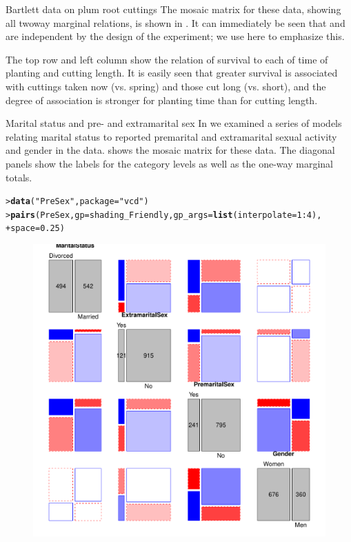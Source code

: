 \documentclass[10pt,krantz2]{krantz}\usepackage[]{graphicx}\usepackage[]{color}
\makeatletter
\newcommand{\hlnum}[1]{\textcolor[rgb]{0.686,0.059,0.569}{#1}}%
\newcommand{\hlstr}[1]{\textcolor[rgb]{0.192,0.494,0.8}{#1}}%
\newcommand{\hlopt}[1]{\textcolor[rgb]{0,0,0}{#1}}%
\newcommand{\hlstd}[1]{\textcolor[rgb]{0.345,0.345,0.345}{#1}}%
\newcommand{\hlkwc}[1]{\textcolor[rgb]{0.333,0.667,0.333}{#1}}%
\newcommand{\hlkwd}[1]{\textcolor[rgb]{0.737,0.353,0.396}{\textbf{#1}}}%
\newenvironment{kframe}{%
 \def\at@end@of@kframe{}%
 \ifinner\ifhmode%
  \def\at@end@of@kframe{\end{minipage}}%
  \begin{minipage}{\columnwidth}%
 \fi\fi%
 \def\FrameCommand##1{\hskip\@totalleftmargin \hskip-\fboxsep
 \colorbox{shadecolor}{##1}\hskip-\fboxsep
     \hskip-\linewidth \hskip-\@totalleftmargin \hskip\columnwidth}%
 \MakeFramed {\advance\hsize-\width
   \@totalleftmargin\z@ \linewidth\hsize
   \@setminipage}}%
 {\par\unskip\endMakeFramed%
 \at@end@of@kframe}
\newenvironment{knitrout}{}{} %
\renewenvironment{knitrout}{\small\renewcommand{\baselinestretch}{.85}}{} %
\makeatother
\begin{document}
\begin{Example}[bartlett]{Bartlett data on plum root cuttings}
\begin{knitrout}
\end{knitrout}
The mosaic matrix for these data, showing all twoway marginal relations, is shown
in .
It can immediately be seen that  and  are independent
by the design of the experiment; we use  here to emphasize
this.

The top row and left column show the relation of survival to each of time of planting
and cutting length.  It is easily seen that greater survival is associated with
cuttings taken now (vs. spring) and those cut long (vs. short),
and the degree of association is stronger for planting time than for cutting length.
\end{Example}

\begin{Example}[marital2]{Marital status and pre- and extramarital sex}
In  we examined a series of models relating marital
status to reported premarital and extramarital sexual activity and gender in the
 data.
 shows the mosaic matrix for these data.
The diagonal panels show the labels for the category levels as well as
the one-way marginal totals.

\begin{knitrout}
\color{fgcolor}\begin{kframe}
\begin{alltt}
\hlstd{> }\hlkwd{data}\hlstd{(}\hlstr{"PreSex"}\hlstd{,} \hlkwc{package} \hlstd{=} \hlstr{"vcd"}\hlstd{)}
\hlstd{> }\hlkwd{pairs}\hlstd{(PreSex,} \hlkwc{gp} \hlstd{= shading_Friendly,} \hlkwc{gp_args} \hlstd{=} \hlkwd{list}\hlstd{(}\hlkwc{interpolate} \hlstd{=} \hlnum{1} \hlopt{:} \hlnum{4}\hlstd{),}
\hlstd{+ }      \hlkwc{space} \hlstd{=} \hlnum{0.25}\hlstd{)}
\end{alltt}
\end{kframe}\begin{figure}[!htb]

\centerline{\includegraphics[width=.8\textwidth]{ch05/fig/marital-pairs-1} }


\end{figure}
\end{knitrout}
\end{Example}
\end{document}

